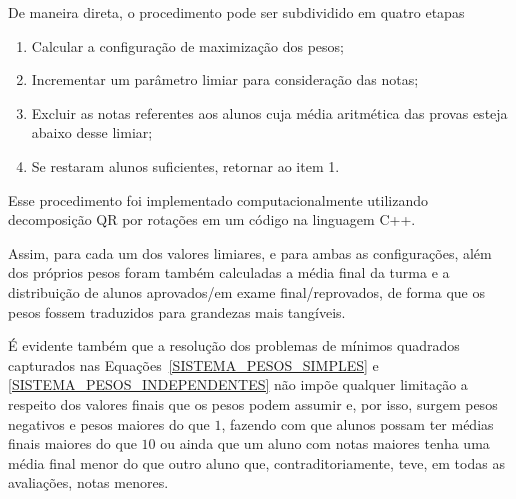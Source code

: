 \documentclass[11pt]{article}
\begin{document}
                De maneira direta, o procedimento pode ser
                subdividido em quatro etapas
                \begin{enumerate}
                        \item Calcular a configuração de
                              maximização dos pesos;
                        \item Incrementar um parâmetro limiar
                              para consideração das notas;
                        \item Excluir as notas referentes aos
                              alunos cuja média aritmética das
                              provas esteja abaixo desse limiar;
                        \item Se restaram alunos suficientes,
                              retornar ao item 1.
                \end{enumerate}
                Esse procedimento foi implementado
                computacionalmente utilizando decomposição
                QR por rotações em um código na
                linguagem C++.

                Assim, para cada um dos valores limiares,
                e para ambas as configurações, além dos próprios
                pesos foram também calculadas a média final
                da turma e a distribuição de alunos
                aprovados/em exame final/reprovados, de forma
                que os pesos fossem traduzidos para grandezas
                mais tangíveis.

                É evidente também que a resolução dos problemas
                de mínimos quadrados capturados nas
                Equações~\ref{SISTEMA_PESOS_SIMPLES} e
                \ref{SISTEMA_PESOS_INDEPENDENTES} não impõe
                qualquer limitação a respeito dos valores
                finais que os pesos podem assumir e,
                por isso,
                surgem pesos negativos e pesos
                maiores do que $1$, fazendo com que alunos
                possam ter médias finais maiores do que $10$
                ou ainda que um aluno com notas maiores
                tenha uma média final menor do que outro
                aluno que, contraditoriamente, teve, em
                todas as avaliações, notas menores.
\end{document}
